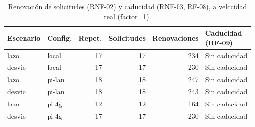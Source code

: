 \begin{table}[H]
\centering
\caption{Renovación de solicitudes (RNF-02) y caducidad (RNF-03, RF-08), a velocidad real (factor=1).}
\label{tab:renovacion_campana}
\small
\begin{tabular}{llrrrl}
\toprule
\textbf{Escenario} & \textbf{Config.} & \textbf{Repet.} & \textbf{Solicitudes} & \textbf{Renovaciones} & \textbf{Caducidad (RF-09)} \\
\midrule
lazo & local & 17 & 17 & 234 & Sin caducidad \\
desvio & local & 17 & 17 & 230 & Sin caducidad \\
lazo & pi-lan & 18 & 18 & 247 & Sin caducidad \\
desvio & pi-lan & 18 & 18 & 243 & Sin caducidad \\
lazo & pi-4g & 12 & 12 & 164 & Sin caducidad \\
desvio & pi-4g & 17 & 17 & 230 & Sin caducidad \\
\bottomrule
\end{tabular}
\end{table}
